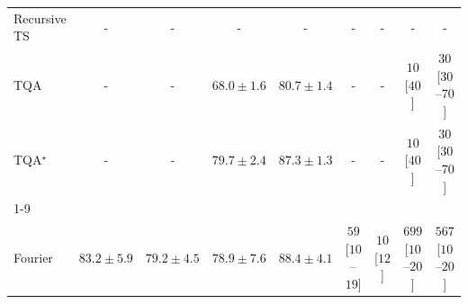 \begin{tabular}{l|cccc|cccc|}
Recursive TS & {\cellcolor[HTML]{000000}} \color[HTML]{F1F1F1} {\cellcolor{white}} \color{black} - & {\cellcolor[HTML]{000000}} \color[HTML]{F1F1F1} {\cellcolor{white}} \color{black} - & {\cellcolor[HTML]{000000}} \color[HTML]{F1F1F1} {\cellcolor{white}} \color{black} - & {\cellcolor[HTML]{000000}} \color[HTML]{F1F1F1} {\cellcolor{white}} \color{black} - & {\cellcolor[HTML]{000000}} \color[HTML]{F1F1F1} {\cellcolor{white}} \color{black} - & {\cellcolor[HTML]{000000}} \color[HTML]{F1F1F1} {\cellcolor{white}} \color{black} - & {\cellcolor[HTML]{000000}} \color[HTML]{F1F1F1} {\cellcolor{white}} \color{black} - & {\cellcolor[HTML]{000000}} \color[HTML]{F1F1F1} {\cellcolor{white}} \color{black} - \\
TQA & {\cellcolor[HTML]{000000}} \color[HTML]{F1F1F1} {\cellcolor{white}} \color{black} - & {\cellcolor[HTML]{000000}} \color[HTML]{F1F1F1} {\cellcolor{white}} \color{black} - & {\cellcolor[HTML]{FFFFE5}} \color[HTML]{000000} $68.0\pm 1.6$ & {\cellcolor[HTML]{68BE71}} \color[HTML]{000000} $80.7\pm 1.4$ & {\cellcolor[HTML]{000000}} \color[HTML]{F1F1F1} {\cellcolor{white}} \color{black} - & {\cellcolor[HTML]{000000}} \color[HTML]{F1F1F1} {\cellcolor{white}} \color{black} - & {\cellcolor[HTML]{FFF7F3}} \color[HTML]{000000} $10$ [$40$] & {\cellcolor[HTML]{FFF3EF}} \color[HTML]{000000} $30$ [$30$--$70$] \\
TQA$^\star$ & {\cellcolor[HTML]{000000}} \color[HTML]{F1F1F1} {\cellcolor{white}} \color{black} - & {\cellcolor[HTML]{000000}} \color[HTML]{F1F1F1} {\cellcolor{white}} \color{black} - & {\cellcolor[HTML]{7AC77A}} \color[HTML]{000000} $79.7\pm 2.4$ & {\cellcolor[HTML]{10743C}} \color[HTML]{F1F1F1} $87.3\pm 1.3$ & {\cellcolor[HTML]{000000}} \color[HTML]{F1F1F1} {\cellcolor{white}} \color{black} - & {\cellcolor[HTML]{000000}} \color[HTML]{F1F1F1} {\cellcolor{white}} \color{black} - & {\cellcolor[HTML]{FFF7F3}} \color[HTML]{000000} $10$ [$40$] & {\cellcolor[HTML]{FFF3EF}} \color[HTML]{000000} $30$ [$30$--$70$] \\
\cline{1-9}
\multicolumn{9}{c}{\rule{0pt}{8pt}SV} \\
\midrule
Fourier & {\cellcolor[HTML]{2F8BBE}} \color[HTML]{F1F1F1} $83.2\pm 5.9$ & {\cellcolor[HTML]{7EADD1}} \color[HTML]{F1F1F1} $79.2\pm 4.5$ & {\cellcolor[HTML]{83AFD3}} \color[HTML]{F1F1F1} $78.9\pm 7.6$ & {\cellcolor[HTML]{045B8F}} \color[HTML]{F1F1F1} $88.4\pm 4.1$ & {\cellcolor[HTML]{FEECE9}} \color[HTML]{000000} $59$ [$10$--$19$] & {\cellcolor[HTML]{FFF7F3}} \color[HTML]{000000} $10$ [$12$] & {\cellcolor[HTML]{7C0177}} \color[HTML]{F1F1F1} $699$ [$10$--$20$] & {\cellcolor[HTML]{C01588}} \color[HTML]{F1F1F1} $567$ [$10$--$20$] \\

\end{tabular}
